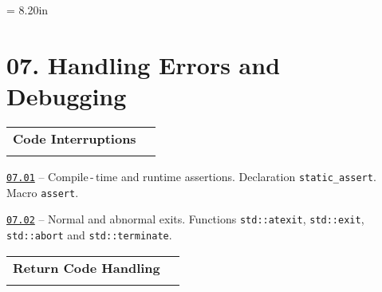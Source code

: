\documentclass[a4paper,12pt]{article}
\renewenvironment{itemize}
{
    \begin{list}{\labelitemi}
    {
      \setlength{\topsep}{0pt}
      \setlength{\partopsep}{0pt}
      \setlength{\parskip}{0pt}
      \setlength{\itemsep}{0pt}
      \setlength{\parsep}{0pt}
      \setlength{\leftmargin}{14.5pt}
    }
}{\end{list}}
\begin{document}
\newpage\thispagestyle{empty}\pdfpageheight = 8.20in\enlargethispage{100in}

\section{07. Handling Errors and Debugging}

\begin{tabular}{!{\vrule width 1pt}L{3.7cm}!{\vrule width 1pt}L{15.3cm}!{\vrule width 0pt}} 


\textbf{Code Interruptions} & \\


\end{tabular}

\medskip\smallskip

\begin{itemize}

    \item \href{https://github.com/i-s-m-mipt/Education/blob/master/projects/examples/source/07.01.cpp}{\texttt{07.01}} -- Compile\,-\,time and runtime assertions. Declaration \lstinline{static_assert}. Macro \lstinline{assert}. 

    \smallskip

    \item \href{https://github.com/i-s-m-mipt/Education/blob/master/projects/examples/source/07.02.cpp}{\texttt{07.02}} -- Normal and abnormal exits. Functions \lstinline{std::atexit}, \lstinline{std::exit}, \lstinline{std::abort} and \lstinline{std::terminate}.

\end{itemize}

\bigskip\medskip

\begin{tabular}{!{\vrule width 1pt}L{4.4cm}!{\vrule width 1pt}L{14.6cm}!{\vrule width 0pt}} 


\textbf{Return Code Handling} & \\


\end{tabular}

\medskip\smallskip
\end{document}
